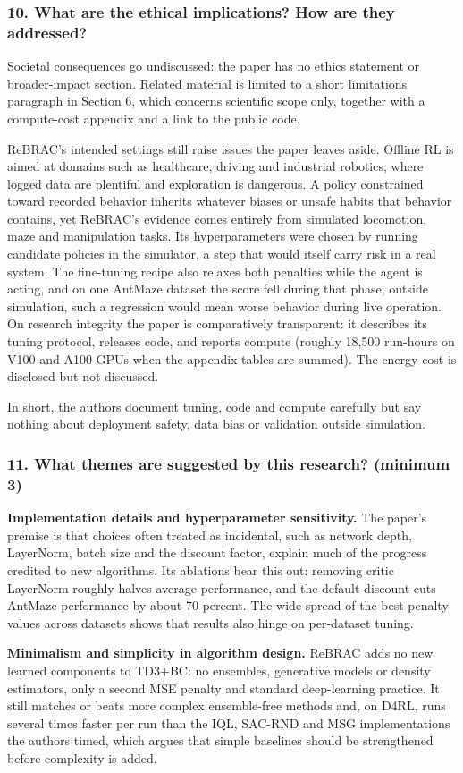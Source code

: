 \documentclass[11pt]{article}
\newcommand{\question}[1]{\subsubsection*{#1}}
\begin{document}
\question{10. What are the ethical implications? How are they addressed?}

Societal consequences go undiscussed: the paper has no ethics statement or broader-impact section. Related material is limited to a short limitations paragraph in Section 6, which concerns scientific scope only, together with a compute-cost appendix and a link to the public code.

ReBRAC's intended settings still raise issues the paper leaves aside. Offline RL is aimed at domains such as healthcare, driving and industrial robotics, where logged data are plentiful and exploration is dangerous. A policy constrained toward recorded behavior inherits whatever biases or unsafe habits that behavior contains, yet ReBRAC's evidence comes entirely from simulated locomotion, maze and manipulation tasks. Its hyperparameters were chosen by running candidate policies in the simulator, a step that would itself carry risk in a real system. The fine-tuning recipe also relaxes both penalties while the agent is acting, and on one AntMaze dataset the score fell during that phase; outside simulation, such a regression would mean worse behavior during live operation. On research integrity the paper is comparatively transparent: it describes its tuning protocol, releases code, and reports compute (roughly 18,500 run-hours on V100 and A100 GPUs when the appendix tables are summed). The energy cost is disclosed but not discussed.

In short, the authors document tuning, code and compute carefully but say nothing about deployment safety, data bias or validation outside simulation.

\question{11. What themes are suggested by this research? (minimum 3)}

\textbf{Implementation details and hyperparameter sensitivity.} The paper's premise is that choices often treated as incidental, such as network depth, LayerNorm, batch size and the discount factor, explain much of the progress credited to new algorithms. Its ablations bear this out: removing critic LayerNorm roughly halves average performance, and the default discount cuts AntMaze performance by about 70 percent. The wide spread of the best penalty values across datasets shows that results also hinge on per-dataset tuning.

\textbf{Minimalism and simplicity in algorithm design.} ReBRAC adds no new learned components to TD3+BC: no ensembles, generative models or density estimators, only a second MSE penalty and standard deep-learning practice. It still matches or beats more complex ensemble-free methods and, on D4RL, runs several times faster per run than the IQL, SAC-RND and MSG implementations the authors timed, which argues that simple baselines should be strengthened before complexity is added.
\end{document}
